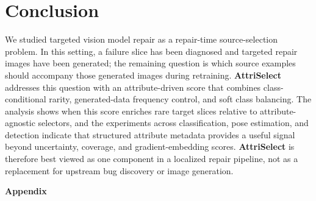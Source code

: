 \documentclass{article}
\newcommand{\modelname}{AttriSelect}
\newcommand{\model}{\textcolor{darkteal}{\textbf{\modelname}}\xspace}
\begin{document}

\section{Conclusion}

We studied targeted vision model repair as a repair-time source-selection problem. In this setting, a failure slice has been diagnosed and targeted repair images have been generated; the remaining question is which source examples should accompany those generated images during retraining. \model addresses this question with an attribute-driven score that combines class-conditional rarity, generated-data frequency control, and soft class balancing. The analysis shows when this score enriches rare target slices relative to attribute-agnostic selectors, and the experiments across classification, pose estimation, and detection indicate that structured attribute metadata provides a useful signal beyond uncertainty, coverage, and gradient-embedding scores. \model is therefore best viewed as one component in a localized repair pipeline, not as a replacement for upstream bug discovery or image generation.





\newpage
\appendix
\begin{center}
    \LARGE \textbf{Appendix}
    \vspace{1em}
\end{center}

\begin{tcolorbox}[
    colback=gray!2!white,
    colframe=gray!20!white,
    arc=4pt,
    boxrule=0.5pt,
    left=12pt, right=12pt, top=10pt, bottom=10pt,
    title=\textbf{Appendix Outline},
    coltitle=black,
    fonttitle=\bfseries\large,
    colbacktitle=gray!10!white,
    rounded corners,
    drop shadow
]
\startcontents[appendix]
\end{tcolorbox}
\vspace{2.5em}
\end{document}
